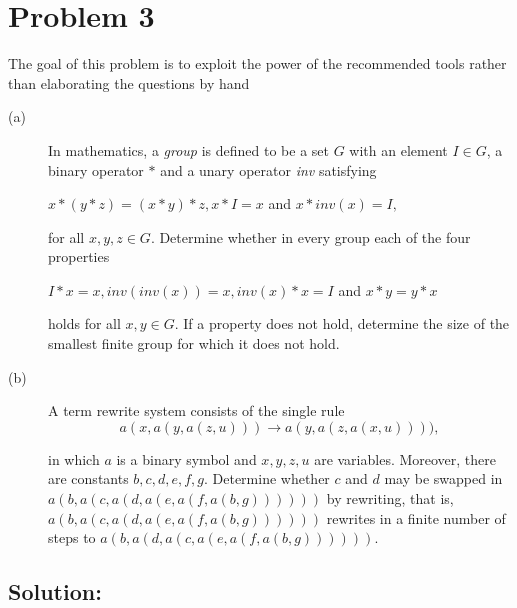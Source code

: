 \section*{Problem 3}

The goal of this problem is to exploit the power of the recommended tools rather than elaborating the questions by hand

\begin{description}
  \item[(a)] In mathematics, a \emph{group} is defined to be a set $G$ with an element $I \in G$, a binary operator $\ast$ and a unary operator \emph{inv} satisfying
      \begin{center}
      $ x \ast(y \ast z)=(x\ast y) \ast z, x \ast I = x $ and $ x \ast inv(x) = I, $
      \end{center}
      for all $x, y, z \in G$. Determine whether in every group each of the four properties
      \begin{center}
      $I \ast x = x, inv(inv(x)) = x, inv(x) \ast x = I $ and $ x \ast y = y \ast x $
      \end{center}
      holds for all $x, y \in G$. If a property does not hold, determine the size of the smallest finite group for which it does not hold.
  \item[(b)] A term rewrite system consists of the single rule
  \[ a(x, a(y, a(z, u))) \rightarrow a(y, a(z, a(x, u)))), \]

  in which $a$ is a binary symbol and $x, y, z, u$ are variables. Moreover, there are constants $b, c, d, e, f, g$. Determine whether $c$ and $d$ may be swapped in $a(b, a(c, a(d, a(e, a(f, a(b, g))))))$ by rewriting, that is, $a(b, a(c, a(d, a(e, a(f, a(b, g))))))$ rewrites in a finite number of steps to $a(b, a(d, a(c, a(e, a(f, a(b, g))))))$.

\end{description}

\vspace{4mm}

\subsection*{Solution:}

